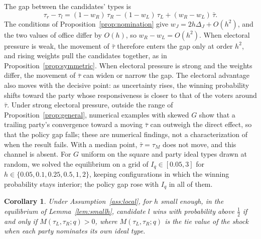 \documentclass[12pt,letterpaper]{article}
\newtheorem{corollary}{Corollary}
\begin{document}
The gap between the candidates' types is
\begin{equation}\label{eq:typegap}
\tau_r-\tau_l=(1-w_R)\,\tau_R-(1-w_L)\,\tau_L+(w_R-w_L)\,\bar\tau .
\end{equation}
The conditions of Proposition~\ref{prop:nomination} give $w_J=2h\Delta_J+O(h^2)$, and the two values of office differ by $O(h)$, so $w_R-w_L=O(h^2)$. When electoral pressure is weak, the movement of $\bar\tau$ therefore enters the gap only at order $h^2$, and rising weights pull the candidates together, as in Proposition~\ref{prop:symmetric}. When electoral pressure is strong and the weights differ, the movement of $\bar\tau$ can widen or narrow the gap. The electoral advantage also moves with the decisive point: as uncertainty rises, the winning probability shifts toward the party whose responsiveness is closer to that of the voters around $\bar\tau$. Under strong electoral pressure, outside the range of Proposition~\ref{prop:general}, numerical examples with skewed $G$ show that a trailing party's convergence toward a moving $\bar\tau$ can outweigh the direct effect, so that the policy gap falls; these are numerical findings, not a characterization of when the result fails. With a median point, $\bar\tau=\tau_M$ does not move, and this channel is absent. For $G$ uniform on the square and party ideal types drawn at random, we solved the equilibrium on a grid of $I_q\in[0.05,3]$ for $h\in\{0.05,0.1,0.25,0.5,1,2\}$, keeping configurations in which the winning probability stays interior; the policy gap rose with $I_q$ in all of them.

\begin{corollary}\label{cor:leadgeneral}
Under Assumption~\ref{ass:local}, for $h$ small enough, in the equilibrium of Lemma~\ref{lem:smallh}, candidate $l$ wins with probability above $\tfrac12$ if and only if $M(\tau_L,\tau_R;q)>0$, where $M(\tau_L,\tau_R;q)$ is the tie value of the shock when each party nominates its own ideal type.
\end{corollary}
\end{document}
